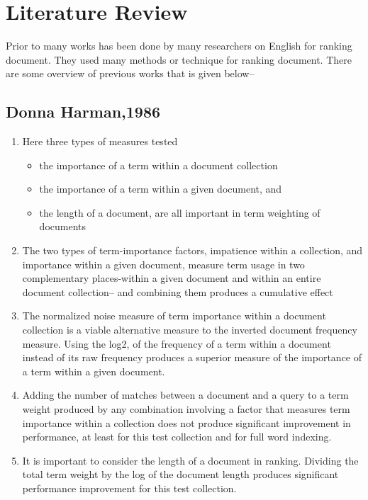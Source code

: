 \chapter{Literature Review}
\label{Ch_Chapter2}


Prior to many works has been done by many researchers on English for ranking document. They used many methods or technique for ranking document. There are some overview of previous works that is given below--

\section{Donna Harman,1986}

\begin{enumerate}
	\item Here three types of measures tested
	\begin{itemize}
		\item the importance of a term within a document collection
		\item the importance of a term within a given document, and
		\item the length of a document, are all important in term weighting of documents
	\end{itemize}
	
	\item The two types of term-importance factors, impatience within a collection, and importance within a given document, measure term usage in two complementary places-within a given document and within an entire document collection-- and combining them produces a cumulative effect
	
	\item The normalized noise measure of term importance within a document collection is a viable alternative measure to the inverted document frequency measure. Using the log2, of the frequency of a term within a document instead of its raw frequency produces a superior measure of the importance of a term within a given document.
	
	\item Adding the number of matches between a document and a query to a term weight produced by any combination involving a factor that measures term importance within a collection does not produce significant improvement in performance, at least for this test collection and for full word indexing.
	
	\item It is important to consider the length of a document in ranking. Dividing the total term weight by the log of the document length produces significant performance improvement for this test collection.
	
\end{enumerate}


